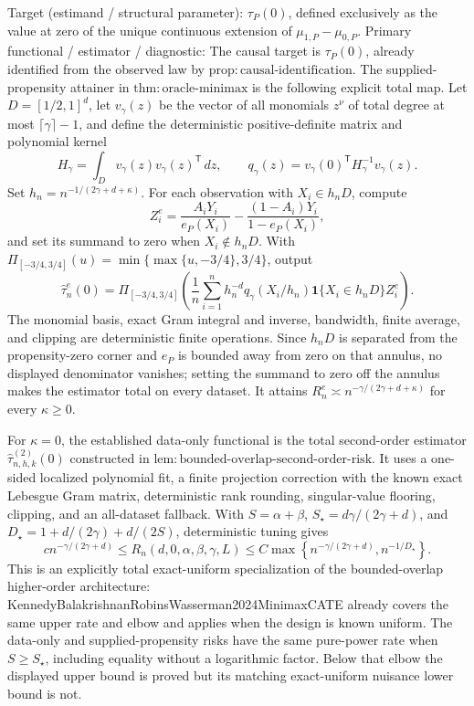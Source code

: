 \documentclass{article}
\begin{document}
Target (estimand / structural parameter): \(\tau_P(0)\), defined exclusively as the value at zero of the unique continuous extension of \(\mu_{1,P}-\mu_{0,P}\).
Primary functional / estimator / diagnostic: The causal target is \(\tau_P(0)\), already identified from the observed law by \(\mathrm{prop:causal\mbox{-}identification}\).  The supplied-propensity attainer in \(\mathrm{thm:oracle\mbox{-}minimax}\) is the following explicit total map.  Let \(D=[1/2,1]^d\), let \(v_\gamma(z)\) be the vector of all monomials \(z^\nu\) of total degree at most \(\lceil\gamma\rceil-1\), and define the deterministic positive-definite matrix and polynomial kernel
\[
 H_\gamma=\int_D v_\gamma(z)v_\gamma(z)^{\mathsf T}\,dz,
 \qquad
 q_\gamma(z)=v_\gamma(0)^{\mathsf T}H_\gamma^{-1}v_\gamma(z).
\]
Set \(h_n=n^{-1/(2\gamma+d+\kappa)}\).  For each observation with \(X_i\in h_nD\), compute
\[
 Z_i^e=\frac{A_iY_i}{e_P(X_i)}-\frac{(1-A_i)Y_i}{1-e_P(X_i)},
\]
and set its summand to zero when \(X_i\notin h_nD\).  With \(\Pi_{[-3/4,3/4]}(u)=\min\{\max\{u,-3/4\},3/4\}\), output
\[
 \widehat\tau_n^e(0)=\Pi_{[-3/4,3/4]}\!\left(
 \frac1n\sum_{i=1}^n h_n^{-d}q_\gamma(X_i/h_n)
 \mathbf 1\{X_i\in h_nD\}Z_i^e
 \right).
\]
The monomial basis, exact Gram integral and inverse, bandwidth, finite average, and clipping are deterministic finite operations.  Since \(h_nD\) is separated from the propensity-zero corner and \(e_P\) is bounded away from zero on that annulus, no displayed denominator vanishes; setting the summand to zero off the annulus makes the estimator total on every dataset.  It attains \(R_n^e\asymp n^{-\gamma/(2\gamma+d+\kappa)}\) for every \(\kappa\geq0\).

For \(\kappa=0\), the established data-only functional is the total second-order estimator \(\widehat\tau^{(2)}_{n,h,k}(0)\) constructed in \(\mathrm{lem:bounded\mbox{-}overlap\mbox{-}second\mbox{-}order\mbox{-}risk}\).  It uses a one-sided localized polynomial fit, a finite projection correction with the known exact Lebesgue Gram matrix, deterministic rank rounding, singular-value flooring, clipping, and an all-dataset fallback.  With \(S=\alpha+\beta\), \(S_\star=d\gamma/(2\gamma+d)\), and \(D_\star=1+d/(2\gamma)+d/(2S)\), deterministic tuning gives
\[
 c n^{-\gamma/(2\gamma+d)}
 \leq R_n(d,0,\alpha,\beta,\gamma,L)
 \leq C\max\left\{n^{-\gamma/(2\gamma+d)},n^{-1/D_\star}\right\}.
\]
This is an explicitly total exact-uniform specialization of the bounded-overlap higher-order architecture: KennedyBalakrishnanRobinsWasserman2024MinimaxCATE already covers the same upper rate and elbow and applies when the design is known uniform.  The data-only and supplied-propensity risks have the same pure-power rate when \(S\geq S_\star\), including equality without a logarithmic factor.  Below that elbow the displayed upper bound is proved but its matching exact-uniform nuisance lower bound is not.
\end{document}
